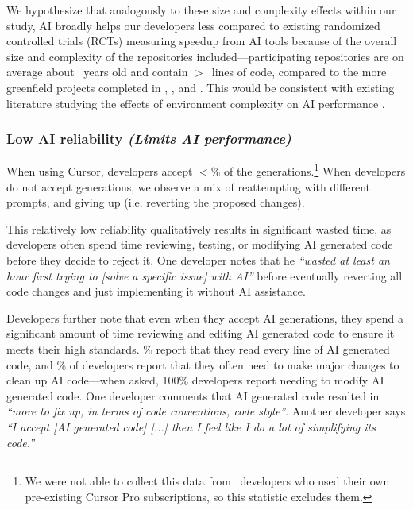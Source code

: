 \documentclass{article}
\newcommand{\devquote}[1]{\textcolor{quotecolor}{\textit{``#1''}}}
\begin{document}
We hypothesize that analogously to these size and complexity effects within our study, AI broadly helps our developers less compared to existing randomized controlled trials (RCTs) measuring speedup from AI tools because of the overall size and complexity of the repositories included---participating repositories are on average about \MeanRepoAgeYears\ years old and contain $>$\MeanRepoLoC\ lines of code, compared to the more greenfield projects completed in \citet{peng2023impactaideveloperproductivity}, \citet{paradis2024doesaiimpactdevelopment}, and \citet{10.1145/3661145}. This would be consistent with existing literature studying the effects of environment complexity on AI performance \cite{wijk2025rebenchevaluatingfrontierai, jimenez2024swebench, liu2023lostmiddlelanguagemodels}.


\subsubsection{Low AI reliability \textnormal{\textit{(Limits AI performance)}}}
\label{sec:factor-low-ai-reliability}

When using Cursor, developers accept $<$\PctAcceptedAddedLinesOfCode \% of the generations.\footnote{We were not able to collect this data from \NumDevelopersWithNoCursorData\ developers who used their own pre-existing Cursor Pro subscriptions, so this statistic excludes them.} When developers do not accept generations, we observe a mix of reattempting with different prompts, and giving up (i.e. reverting the proposed changes).

This relatively low reliability qualitatively results in significant wasted time, as developers often spend time reviewing, testing, or modifying AI generated code before they decide to reject it. One developer notes that he \devquote{wasted at least an hour first trying to [solve a specific issue] with AI} before eventually reverting all code changes and just implementing it without AI assistance.

Developers further note that even when they accept AI generations, they spend a significant amount of time reviewing and editing AI generated code to ensure it meets their high standards. \PctDevelopersExitSurveyReadEveryLineAICode\% report that they read every line of AI generated code, and \PctDevelopersExitSurveyEditMajorChangesAICode\%  of developers report that they often need to make major changes to clean up AI code---when asked, 100\% developers report needing to modify AI generated code. One developer comments that AI generated code resulted in \devquote{more to fix up, in terms of code conventions, code style}. Another developer says \devquote{I accept [AI generated code] [...] then I feel like I do a lot of simplifying its code.} 
\end{document}

